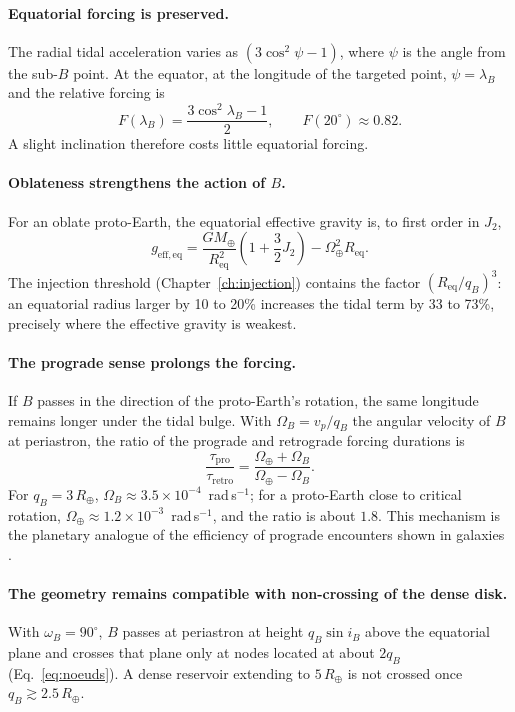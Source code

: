 \documentclass[11pt,a4paper,openany]{report}
\newcommand{\Mt}{M_{\oplus}}
\newcommand{\Rt}{R_{\oplus}}
\newcommand{\Req}{R_{\mathrm{eq}}}
\begin{document}
\paragraph{Equatorial forcing is preserved.}
The radial tidal acceleration varies as $(3\cos^2\psi-1)$, where $\psi$ is the angle from the
sub-$B$ point. At the equator, at the longitude of the targeted point, $\psi=\lambda_B$ and the
relative forcing is
\begin{equation}
F(\lambda_B)=\frac{3\cos^2\lambda_B-1}{2},
\qquad F(20^\circ)\approx0.82.
\label{eq:Flambda}
\end{equation}
A slight inclination therefore costs little equatorial forcing.

\paragraph{Oblateness strengthens the action of \texorpdfstring{$B$}{B}.}
For an oblate proto-Earth, the equatorial effective gravity is, to first order in $J_2$,
\begin{equation}
g_{\mathrm{eff,eq}}=\frac{G\Mt}{\Req^2}\left(1+\frac32J_2\right)-\Omega_\oplus^2\Req.
\label{eq:geffJ2}
\end{equation}
The injection threshold (Chapter~\ref{ch:injection}) contains the factor $(\Req/q_B)^3$: an
equatorial radius larger by 10 to 20\% increases the tidal term by 33 to 73\%, precisely where the
effective gravity is weakest.

\paragraph{The prograde sense prolongs the forcing.}
If $B$ passes in the direction of the proto-Earth's rotation, the same longitude remains longer
under the tidal bulge. With $\Omega_B=v_p/q_B$ the angular velocity of $B$ at periastron, the ratio
of the prograde and retrograde forcing durations is
\begin{equation}
\frac{\tau_{\mathrm{pro}}}{\tau_{\text{retro}}}=\frac{\Omega_\oplus+\Omega_B}{\Omega_\oplus-\Omega_B}.
\label{eq:prograde}
\end{equation}
For $q_B=3\,\Rt$, $\Omega_B\approx3.5\times10^{-4}$~rad\,s$^{-1}$; for a proto-Earth close to
critical rotation, $\Omega_\oplus\approx1.2\times10^{-3}$~rad\,s$^{-1}$, and the ratio is about
$1.8$. This mechanism is the planetary analogue of the efficiency of prograde encounters shown in
galaxies \cite{ToomreToomre1972}.

\paragraph{The geometry remains compatible with non-crossing of the dense disk.}
With $\omega_B=90^\circ$, $B$ passes at periastron at height $q_B\sin i_B$ above the equatorial
plane and crosses that plane only at nodes located at about $2q_B$ (Eq.~\eqref{eq:noeuds}). A dense
reservoir extending to $5\,\Rt$ is not crossed once $q_B\gtrsim2.5\,\Rt$.
\end{document}
